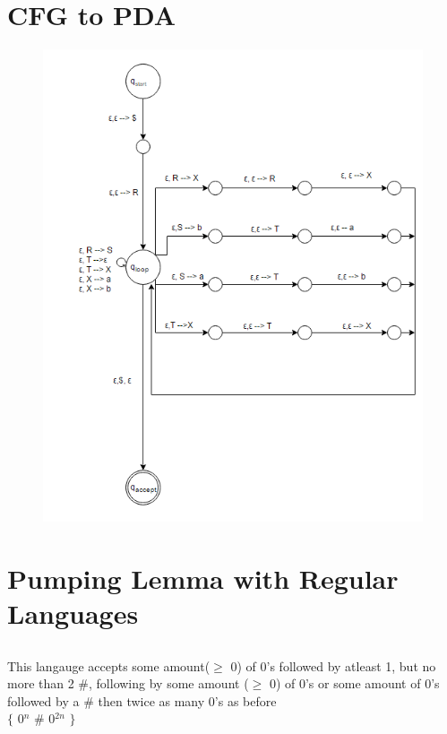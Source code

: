 \documentclass[10pt,a4paper]{article}
\begin{document}
\section{CFG to PDA}
	\begin{figure}[h]
		\includegraphics[scale = .75]{CFGtoPDA.png}
  		\label{fig:cfgtopda}
	\end{figure}

\section{Pumping Lemma with Regular Languages}
\subsection{}
	This langauge accepts some amount($\geq$ 0) of 0's followed by atleast 1, but no more than 2 \#, 			following by some amount ($\geq$ 0) of 0's or some amount of 0's followed by a \# then twice as 			many 0's as before\\
	$\lbrace$ 0$^{n}$ \# 0$^{2n}$ $\rbrace$
\end{document}
